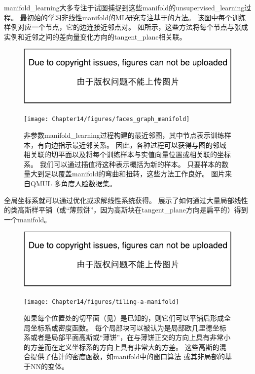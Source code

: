 \gls{manifold_learning}大多专注于试图捕捉到这些\gls{manifold}的\gls{unsupervised_learning}过程。
最初始的学习非线性\gls{manifold}的\gls{ML}研究专注基于的方法。
该图中每个训练样例对应一个节点，它的边连接近邻点对。
如所示，这些方法\citep{Scholkopf98,Roweis2000-lle-small,Tenenbaum2000-isomap,Brand2003-small,Belkin+Niyogi-2003,Donoho+Carrie-03,Weinberger04a-small,SNE-nips15-small,VanDerMaaten08-small}将每个节点与张成实例和近邻之间的差向量变化方向的\gls{tangent_plane}相关联。

\begin{figure}[!htb]
\ifOpenSource
\centerline{\includegraphics{figure.pdf}}
\else
\centerline{\texttt{[image: Chapter14/figures/faces\_graph\_manifold]}}
\fi
\caption{非参数\gls{manifold_learning}过程构建的最近邻图，其中节点表示训练样本，有向边指示最近邻关系。
因此，各种过程可以获得与图的邻域相关联的切平面以及将每个训练样本与实值向量位置或相关联的坐标系。
我们可以通过插值将这种表示概括为新的样本。
只要样本的数量大到足以覆盖\gls{manifold}的弯曲和扭转，这些方法工作良好。 
图片来自QMUL 多角度人脸数据集\citep{Gong-et-al-2000}。
}
\label{fig:chap14_faces_graph_manifold}
\end{figure}

全局坐标系就可以通过优化或求解线性系统获得。
展示了如何通过大量局部线性的类高斯样平铺（或``薄煎饼''，因为高斯块在\gls{tangent_plane}方向是扁平的）得到一个\gls{manifold}。

\begin{figure}[!htb]
\ifOpenSource
\centerline{\includegraphics{figure.pdf}}
\else
\centerline{\texttt{[image: Chapter14/figures/tiling-a-manifold]}}
\fi
\caption{如果每个位置处的切平面（见）是已知的，则它们可以平铺后形成全局坐标系或密度函数。
每个局部块可以被认为是局部欧几里德坐标系或者是局部平面高斯或``薄饼''，在与薄饼正交的方向上具有非常小的方差而在定义坐标系的方向上具有非常大的方差。
这些高斯的混合提供了估计的密度函数，如\gls{manifold}中的窗口算法\citep{Vincent-Bengio-2003-short} 或其非局部的基于\gls{NN}的变体\citep{Bengio-Larochelle-NLMP-NIPS-2006-short}。
}
\label{fig:chap14_tiling-a-manifold}
\end{figure}

